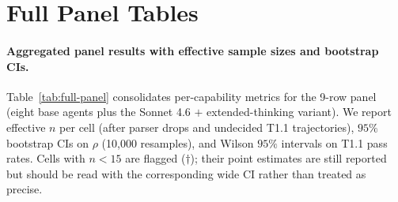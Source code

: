 
\section{Full Panel Tables}
\label{app:full-panel-tables}

\paragraph{Aggregated panel results with effective sample sizes and bootstrap CIs.}
Table~\ref{tab:full-panel} consolidates per-capability metrics for the 9-row panel (eight base agents plus the Sonnet 4.6 $+$ extended-thinking variant). We report effective $n$ per cell (after parser drops and undecided T1.1 trajectories), $95\%$ bootstrap CIs on $\rho$ (10,000 resamples), and Wilson $95\%$ intervals on T1.1 pass rates. Cells with $n < 15$ are flagged ($\dagger$); their point estimates are still reported but should be read with the corresponding wide CI rather than treated as precise.

